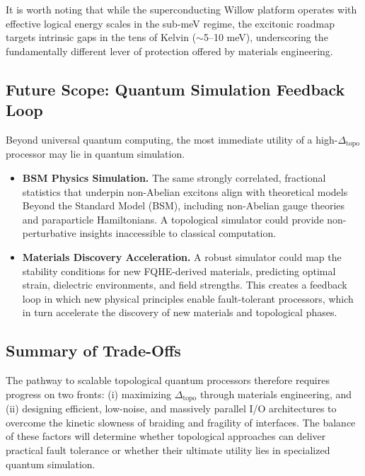 \documentclass[aps,prl,twocolumn,superscriptaddress]{revtex4-2}
\begin{document}
It is worth noting that while the superconducting Willow platform operates with effective logical energy scales in the sub-meV regime, the excitonic roadmap targets intrinsic gaps in the tens of Kelvin ($\sim$5--10 meV), underscoring the fundamentally different lever of protection offered by materials engineering. 



\subsection{Future Scope: Quantum Simulation Feedback Loop}
Beyond universal quantum computing, the most immediate utility of a high-$\Delta_{\text{topo}}$ processor may lie in quantum simulation.  
\begin{itemize}
    \item \textbf{BSM Physics Simulation.} The same strongly correlated, fractional statistics that underpin non-Abelian excitons align with theoretical models Beyond the Standard Model (BSM), including non-Abelian gauge theories and paraparticle Hamiltonians. A topological simulator could provide non-perturbative insights inaccessible to classical computation.  
    \item \textbf{Materials Discovery Acceleration.} A robust simulator could map the stability conditions for new FQHE-derived materials, predicting optimal strain, dielectric environments, and field strengths. This creates a feedback loop in which new physical principles enable fault-tolerant processors, which in turn accelerate the discovery of new materials and topological phases.  
\end{itemize}

\subsection{Summary of Trade-Offs}
The pathway to scalable topological quantum processors therefore requires progress on two fronts: (i) maximizing $\Delta_{\text{topo}}$ through materials engineering, and (ii) designing efficient, low-noise, and massively parallel I/O architectures to overcome the kinetic slowness of braiding and fragility of interfaces. The balance of these factors will determine whether topological approaches can deliver practical fault tolerance or whether their ultimate utility lies in specialized quantum simulation.
\end{document}
